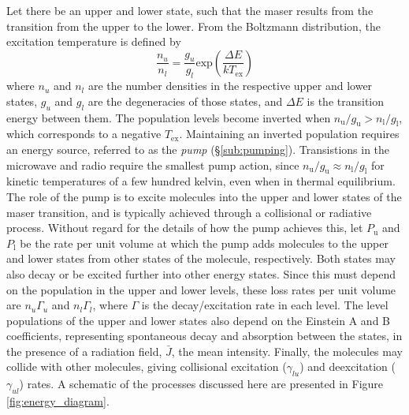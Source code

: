Let there be an upper and lower state, such that the maser results from the transition from the upper to the lower. From the Boltzmann distribution, the excitation temperature is defined by
\begin{equation}
\label{eq:level_pops}
\frac{n_u}{n_{l}} = \frac{g_{u}}{g_{l}} \mathrm{exp}\left( \frac{\Delta E}{kT_{\mathrm{ex}}} \right)
\end{equation}
where $n_u$ and $n_l$ are the number densities in the respective upper and lower states, $g_u$ and $g_l$ are the degeneracies of those states, and $\Delta E$ is the transition energy between them. The population levels become inverted when $n_\mathrm{u}/g_\mathrm{u} \gt n_\mathrm{l}/g_\mathrm{l}$, which corresponds to a negative $T_\mathrm{ex}$. Maintaining an inverted population requires an energy source, referred to as the {\it pump} (\S\ref{sub:pumping}). Transistions in the microwave and radio require the smallest pump action, since $n_\mathrm{u}/g_\mathrm{u} \approx n_\mathrm{l}/g_\mathrm{l}$ for kinetic temperatures of a few hundred kelvin, even when in thermal equilibrium. The role of the pump is to excite molecules into the upper and lower states of the maser transition, and is typically achieved through a collisional or radiative process. Without regard for the details of how the pump achieves this, let $P_\mathrm{u}$ and $P_\mathrm{l}$ be the rate per unit volume at which the pump adds molecules to the upper and lower states from other states of the molecule, respectively. Both states may also decay or be excited further into other energy states. Since this must depend on the population in the upper and lower levels, these loss rates per unit volume are $n_u\Gamma_u$ and $n_l\Gamma_l$, where $\Gamma$ is the decay/excitation rate in each level. The level populations of the upper and lower states also depend on the Einstein A and B coefficients, representing spontaneous decay and absorption between the states, in the presence of a radiation field, $\bar{J}$, the mean intensity. Finally, the molecules may collide with other molecules, giving collisional excitation ($\gamma_{lu}$) and deexcitation ($\gamma_{ul}$) rates. A schematic of the processes discussed here are presented in Figure \ref{fig:energy_diagram}.

